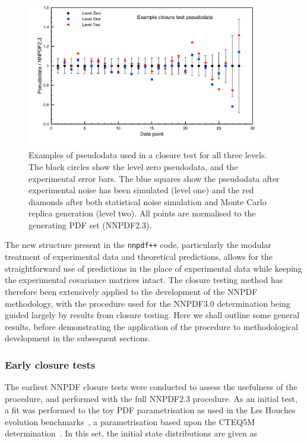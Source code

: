\begin{figure}[ht]
\centering
\includegraphics[width=0.9\textwidth]{7-PostLHC/figs/Closuretest_levels/closuretest_levels.pdf}
\caption[Closure test pseudodata example]{Examples of pseudodata used in a closure test for all three levels. The black circles show the level zero pseudodata, and the experimental error bars. The blue squares show the pseudodata after experimental noise has been simulated (level one) and the red diamonds after both statistical noise simulation and Monte Carlo replica generation (level two). All points are normalised to the generating PDF set (NNPDF2.3).}
\label{fig:closurepseudodata}
\end{figure}

The new structure present in the {\tt nnpdf++} code, particularly the modular treatment of experimental data and theoretical predictions, allows for the straightforward use of predictions in the place of experimental data while keeping the experimental covariance matrices intact. The closure testing method has therefore been extensively applied to the development of the NNPDF methodology, with the procedure used for the NNPDF3.0 determination being guided largely by results from closure testing. Here we shall outline some general results, before demonstrating the application of the procedure to methodological development in the subsequent sections.

\subsubsection{Early closure tests}
The earliest NNPDF closure tests were conducted to assess the usefulness of the procedure, and performed with the full NNPDF2.3 procedure. As an initial test, a fit was performed to the toy PDF parametrisation as used in the Les Houches evolution benchmarks~\cite{Giele:2002hx}, a parametrisation based upon the CTEQ5M determination~\cite{Lai:1999wy}. In this set, the initial state distributions are given as

